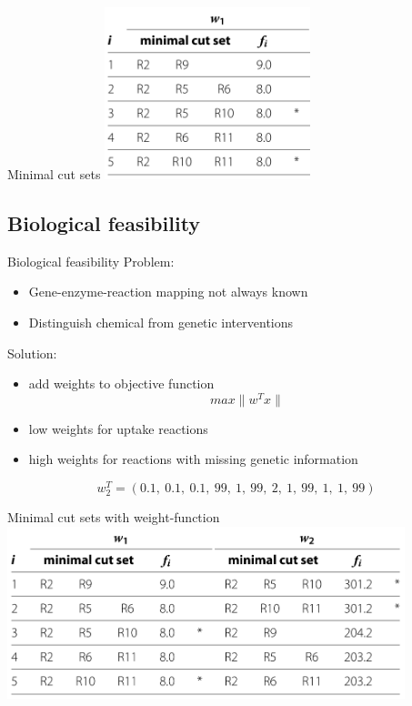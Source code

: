 \documentclass{beamer}
\begin{document}
\begin{frame}{Minimal cut sets}
    \includegraphics[height=5cm]{grafik/table2a} \\
\end{frame}

\subsection{Biological feasibility}

\begin{frame}{Biological feasibility}
    Problem:
    \begin{itemize}
        \item Gene-enzyme-reaction mapping not always known
        \item Distinguish chemical from genetic interventions
    \end{itemize}
\pause
    Solution: 
    \begin{itemize}
        \item add weights to objective function
        $$max \|w^T x\| $$
        \item low weights for uptake reactions
        \item high weights for reactions with missing genetic information
    \end{itemize}
    \begin{example}
        $$w_2^T = (0.1, ~ 0.1, ~ 0.1, ~ 99, ~ 1, ~ 99, ~ 2, ~ 1, ~ 99, ~ 1, ~ 1, ~ 99)$$
    \end{example}
\end{frame}

\begin{frame}{Minimal cut sets with weight-function}
    \includegraphics[height=5cm]{grafik/table2} \\
\end{frame}
\end{document}
